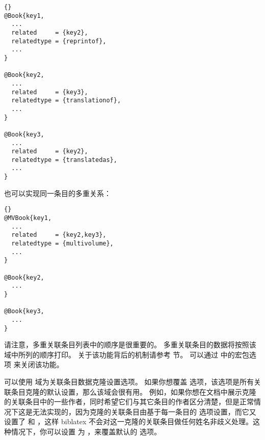 \begin{lstlisting}[style=bibtex]{}
@Book{key1,
  ...
  related     = {key2},
  relatedtype = {reprintof},
  ...
}

@Book{key2,
  ...
  related     = {key3},
  relatedtype = {translationof},
  ...
}

@Book{key3,
  ...
  related     = {key2},
  relatedtype = {translatedas},
  ...
}
\end{lstlisting}
%
也可以实现同一条目的多重关系：
\begin{lstlisting}[style=bibtex]{}
@MVBook{key1,
  ...
  related     = {key2,key3},
  relatedtype = {multivolume},
  ...
}

@Book{key2,
  ...
}

@Book{key3,
  ...
}
\end{lstlisting}
%
请注意，多重关联条目列表中的顺序是很重要的。
多重关联条目的数据将按照该域中所列的顺序打印。
关于该功能背后的机制请参考  节。
可以通过  中的宏包选项  来关闭该功能。


可以使用  域为关联条目数据克隆设置选项。
如果你想覆盖 选项，该选项是所有关联条目克隆的默认设置，那么该域会很有用。
例如，如果你想在文档中展示克隆的关联条目中的一些作者，同时希望它们与其它条目的作者区分清楚，但是正常情况下这是无法实现的，因为克隆的关联条目由基于每一条目的  选项设置，而它又设置了  和 ，这样 biblatex 不会对这一克隆的关联条目做任何姓名非歧义处理。这种情况下，你可以设置  为 ，来覆盖默认的 选项。

